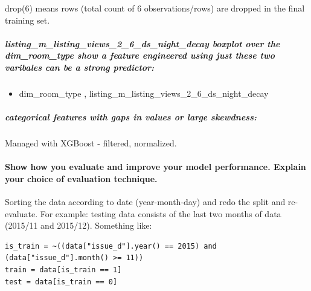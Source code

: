 \documentclass[11pt]{article}
\providecommand{\tightlist}{%
      \setlength{\itemsep}{0pt}\setlength{\parskip}{0pt}}
\begin{document}
drop(6) means rows (total count of 6 observations/rows) are dropped in
the final training set.

\subparagraph{listing\_m\_listing\_views\_2\_6\_ds\_night\_decay boxplot
over the dim\_room\_type show a feature engineered using just these two
varibales can be a strong
predictor:}\label{listing_m_listing_views_2_6_ds_night_decay-boxplot-over-the-dim_room_type-show-a-feature-engineered-using-just-these-two-varibales-can-be-a-strong-predictor}

\begin{itemize}
\tightlist
\item
  dim\_room\_type , listing\_m\_listing\_views\_2\_6\_ds\_night\_decay
\end{itemize}

\subparagraph{categorical features with gaps in values or large
skewdness:}\label{categorical-features-with-gaps-in-values-or-large-skewdness}

Managed with XGBoost - filtered, normalized.

\paragraph{Show how you evaluate and improve your model performance.
Explain your choice of evaluation
technique.}\label{show-how-you-evaluate-and-improve-your-model-performance.-explain-your-choice-of-evaluation-technique.}

Sorting the data according to date (year-month-day) and redo the split
and re-evaluate. For example: testing data consists of the last two
months of data (2015/11 and 2015/12). Something like:

\begin{verbatim}
is_train = ~((data["issue_d"].year() == 2015) and (data["issue_d"].month() >= 11))
train = data[is_train == 1]
test = data[is_train == 0]
\end{verbatim}
\end{document}
